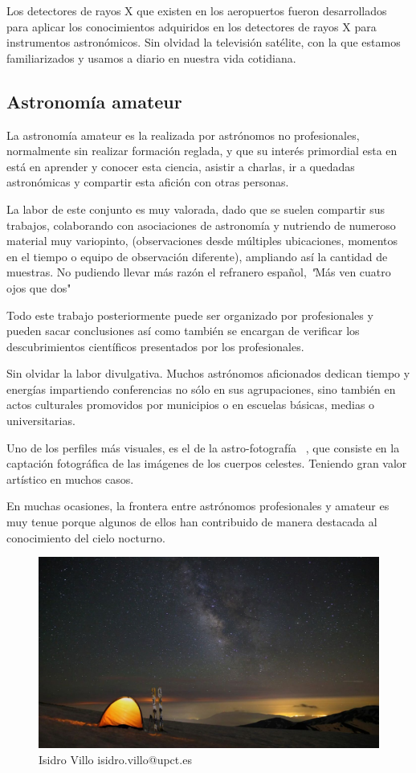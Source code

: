 Los detectores de  rayos X que existen en los aeropuertos fueron desarrollados  para aplicar los  conocimientos  adquiridos en los detectores de rayos X para instrumentos astronómicos. 
Sin olvidad la televisión satélite, con la que estamos familiarizados y usamos a diario en nuestra vida cotidiana.  


\newpage

\subsection{Astronomía amateur}

La astronomía amateur es la realizada por astrónomos no profesionales, normalmente sin realizar formación reglada, y que su interés primordial esta en
está en aprender y conocer esta ciencia, asistir a charlas, ir a quedadas astronómicas y compartir esta afición con otras personas.

\bigskip
La labor de este conjunto es muy valorada, dado que se suelen compartir sus trabajos, colaborando con asociaciones de astronomía y nutriendo de numeroso material muy variopinto, (observaciones desde múltiples ubicaciones, momentos en el tiempo o equipo de observación diferente), ampliando así la cantidad de muestras. No pudiendo llevar más razón el refranero español, \textit"Más ven cuatro ojos que dos"

\bigskip
Todo este trabajo posteriormente puede ser organizado por profesionales y pueden sacar conclusiones así como también se encargan de verificar los descubrimientos científicos presentados por los profesionales. 

\bigskip
Sin olvidar la labor divulgativa. Muchos astrónomos aficionados dedican tiempo y energías impartiendo conferencias no sólo en sus agrupaciones, sino también en actos culturales promovidos por municipios o en escuelas básicas, medias o universitarias. 

\bigskip
Uno de los perfiles más visuales, es el de la astro-fotografía ~\cite{AstroFoto}, que consiste  en la captación fotográfica de las imágenes de los cuerpos celestes. Teniendo gran valor artístico en muchos casos.

\bigskip
En muchas ocasiones, la frontera entre astrónomos profesionales y amateur es muy tenue porque algunos de ellos han contribuido de manera destacada al  conocimiento del cielo nocturno.


\begin{figure}
\centering
\includegraphics[width=0.7\linewidth]{../images/nightsky}
\caption{Isidro Villo isidro.villo@upct.es}
\label{fig:nightsky}
\end{figure}


